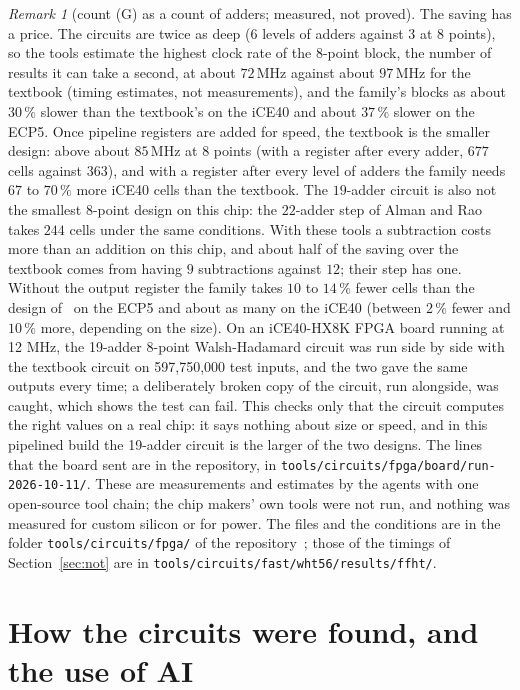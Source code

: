 \documentclass[10pt]{article}
\theoremstyle{remark}
\newtheorem{remark}[proposition]{Remark}
\newcommand{\cntG}{\textup{(G)}}
\begin{document}
\begin{remark}[count \cntG{} as a count of adders; measured, not proved]
The saving has a price. The circuits are twice as deep ($6$ levels of adders against $3$ at $8$ points),
so the tools estimate the highest clock rate of the $8$-point block, the number of results it can take a
second, at about $72$\,MHz against about $97$\,MHz for the textbook (timing estimates, not measurements),
and the family's blocks as about $30\,\%$ slower
than the textbook's on the iCE40 and about $37\,\%$ slower on the ECP5. Once pipeline registers are added
for speed, the textbook is the smaller design: above about $85$\,MHz at $8$ points (with a register after
every adder, $677$ cells against $363$), and with a register after every level of adders the family needs
$67$ to $70\,\%$ more iCE40 cells than the textbook. The $19$-adder circuit is also not the smallest
$8$-point design on this chip: the $22$-adder step of Alman and Rao~\cite{AR} takes $244$ cells under the
same conditions. With these tools a subtraction costs more than an addition on this chip, and about half
of the saving over the textbook comes from having $9$ subtractions against $12$; their step has one.
Without the output register the family takes $10$ to $14\,\%$ fewer cells than the design of~\cite{CFL} on
the ECP5 and about as many on the iCE40 (between $2\,\%$ fewer and $10\,\%$ more, depending on the size).
On an iCE40-HX8K FPGA board running at 12 MHz, the 19-adder 8-point Walsh-Hadamard circuit was run side by side with the textbook circuit on 597{,}750{,}000 test inputs, and the two gave the same outputs every time; a deliberately broken copy of the circuit, run alongside, was caught, which shows the test can fail. This checks only that the circuit computes the right values on a real chip: it says nothing about size or speed, and in this pipelined build the 19-adder circuit is the larger of the two designs. The lines that the board sent are in the repository, in \texttt{tools/circuits/fpga/board/run-2026-10-11/}.
These are measurements and estimates by the agents with one open-source tool chain; the chip makers' own
tools were not run, and nothing was measured for custom silicon or for power. The files and the conditions
are in the folder \verb|tools/circuits/fpga/| of the repository~\cite{Repo}; those of the timings of
Section~\ref{sec:not} are in \verb|tools/circuits/fast/wht56/results/ffht/|.
\end{remark}


\section{How the circuits were found, and the use of AI}\label{sec:found}
\end{document}
